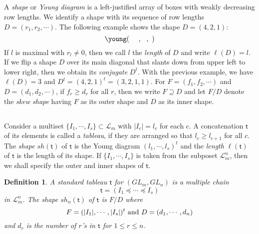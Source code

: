 \documentclass[11pt]{amsart}
\numberwithin{equation}{subsection}
\newtheorem{definition}[theorem]{Definition}
\begin{document}
\subsection{}

A \textit{shape} or \textit{Young diagram} is a left-justified array of
boxes with weakly decreasing row lengths. We identify a shape with its
sequence of row lengths $D=(r_{1},r_{2},\cdots )$. The following example
shows the shape $D=(4,2,1)$:
\begin{equation*}
\young(\ \ \ \ ,\ \ ,\ )
\end{equation*}
If $l$ is maximal with $r_{l}\neq 0$, then we call $l$ the \textit{length}
of $D$ and write $\ell (D)=l$. If we flip a shape $D$ over its main diagonal
that slants down from upper left to lower right, then we obtain its 
\textit{conjugate} $D^{t}$. With the previous example, we have $\ell (D)=3$ and 
$D^{t}=(4,2,1)^{t}=(3,2,1,1)$. For $F=(f_{1},f_{2},\cdots )$ and 
$D=(d_{1},d_{2},\cdots )$, if $f_{r}\geq d_{r}$ for all $r$, then we write 
$F\supseteq D$ and let $F/D$ denote the \textit{skew shape} having $F$ as its
outer shape and $D$ as its inner shape.

\subsection{}\label{tab-chain}

Consider a multiset $\{I_{1},\cdots ,I_{s}\}\subset \mathcal{L}_{m}$ with 
$|I_{c}|=l_{c}$ for each $c$. A concatenation $\mathsf{t}$ of its
elements is called a \textit{tableau}, if they are arranged so that 
$l_{c}\geq l_{c+1}$ for all $c$. The \textit{shape} $sh(\mathsf{t})$ of 
$\mathsf{t}$ is the Young diagram $(l_{1},\cdots ,l_{s})^{t}$ and the 
\textit{length} $\ell (\mathsf{t})$ of $\mathsf{t}$ is the length of its shape. 
If $\{I_{1},\cdots ,I_{s}\}$ is taken from the subposet $\mathcal{L}_{m}^{n}$,
then we shall specify the outer and inner shapes of $\mathsf{t}$.

\begin{definition}\label{def_GL-stm}
A standard tableau $\mathsf{t}$ for $({GL}_{{m}},{GL}_{{n}})$ is a multiple chain 
$$
\mathsf{t}=\left( I_{1}\preceq \cdots \preceq I_{s} \right)
$$ 
in $\mathcal{L}_{m}^{n}$. The shape $sh_{n}(\mathsf{t})$ of $\mathsf{t}$ is $F/D$ 
where\begin{equation*}
F =(|I_{1}|,\cdots , |I_{s}|)^{t} \hbox{ and } D =(d_{1},\cdots ,d_{n})
\end{equation*}and $d_{r}$ is the number of $r$'s in $\mathsf{t}$ for $1\leq r\leq n$.
\end{definition}
\end{document}
